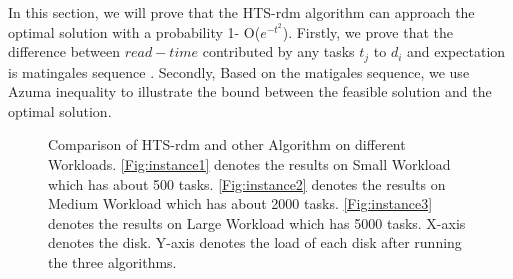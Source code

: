 \documentclass[conference]{IEEEtran}
\begin{document}
In this section, we will prove that the HTS-rdm algorithm can approach the optimal solution with a probability 1- O($e^{-t^2}$). Firstly, we prove that the difference between $read-time$ contributed by any tasks $t_j$ to $d_i$ and expectation is matingales sequence \cite{b12}. Secondly, Based on the matigales sequence, we use Azuma inequality to illustrate the bound between the feasible solution and the optimal solution.
\begin{figure}[!t]
	\centering
	\quad\quad %
	\quad\quad
	\vspace{-1ex}
	\caption{Comparison of HTS-rdm and other Algorithm on different Workloads. \ref{Fig:instance1} denotes the results on Small Workload which has about 500 tasks. \ref{Fig:instance2} denotes the results on Medium Workload which has about 2000 tasks.
	\ref{Fig:instance3} denotes the results on Large Workload which has 5000 tasks. X-axis denotes the disk. Y-axis denotes the load of each disk after running the three algorithms.}
	\label{Fig:instance}
	\vspace{-1ex}
\end{figure}
\end{document}
